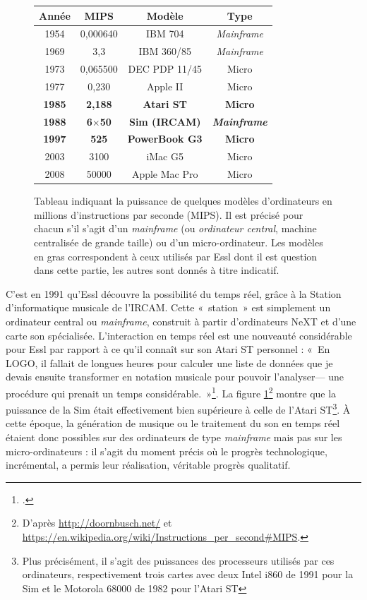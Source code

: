 \documentclass[a4paper,12pt]{article}
\newcommand{\guill}[1]{«~#1~»}
\begin{document}
\begin{figure}[h!]
\begin{center}
\begin{tabular}{|c|c|c|c|}
\hline
\textbf{Année} & \textbf{MIPS} & \textbf{Modèle} & \textbf{Type} \\
\hline
1954 & 0,000640 & IBM 704 & \emph{Mainframe} \\
\hline
1969 & 3,3 & IBM 360/85 & \emph{Mainframe} \\
\hline
1973 & 0,065500 & DEC PDP 11/45 & Micro \\
\hline
1977 & 0,230 & Apple II & Micro \\
\hline
\textbf{1985} & \textbf{2,188} & \textbf{Atari ST} & \textbf{Micro} \\
\hline
\textbf{1988} & \textbf{6$\times$50} & \textbf{Sim (IRCAM)} & \textbf{\emph{Mainframe}} \\
\hline
\textbf{1997} & \textbf{525} & \textbf{PowerBook G3} & \textbf{Micro} \\
\hline
2003 & 3100 & iMac G5 & Micro \\
\hline
2008 & 50000 & Apple Mac Pro & Micro \\
\hline
\end{tabular}
\label{tableaumips}
\caption{\footnotesize Tableau indiquant la puissance de quelques modèles d'ordinateurs en millions d'instructions par seconde (MIPS). Il est précisé pour chacun s'il s'agit d'un \emph{mainframe} (ou \emph{ordinateur central}, machine centralisée de grande taille) ou d'un micro-ordinateur. Les modèles en gras correspondent à ceux utilisés par Essl dont il est question dans cette partie, les autres sont donnés à titre indicatif.}
\end{center}
\end{figure}

C'est en 1991 qu'Essl découvre la possibilité du temps réel, grâce à la Station d'informatique musicale de l'IRCAM. Cette \guill{station} est simplement un ordinateur central ou \emph{mainframe}, construit à partir d'ordinateurs NeXT et d'une carte son spécialisée. L'interaction en temps réel est une nouveauté considérable pour Essl par rapport à ce qu'il connaît sur son Atari ST personnel : \guill{En LOGO, il fallait de longues heures pour calculer une liste de données que je devais ensuite transformer en notation musicale pour pouvoir l'analyser--- une procédure qui prenait un temps considérable.}\footnote{\cite{essl2010rtc}.}. La figure \ref{tableaumips}\footnote{D'après \href{http://doornbusch.net/}{http://doornbusch.net/} et  \href{https://en.wikipedia.org/wiki/Instruœctions\_per\_second\#MIPS}{https://en.wikipedia.org/wiki/Instructions\_per\_second\#MIPS}.} montre que la puissance de la Sim était effectivement bien supérieure à celle de l'Atari ST\footnote{Plus précisément, il s'agit des puissances des processeurs utilisés par ces ordinateurs, respectivement trois cartes avec deux Intel i860 de 1991 pour la Sim et le Motorola 68000 de 1982 pour l'Atari ST}. À cette époque, la génération de musique ou le traitement du son en temps réel étaient donc possibles sur des ordinateurs de type \emph{mainframe} mais pas sur les micro-ordinateurs : il s'agit du moment précis où le progrès technologique, incrémental, a permis leur réalisation, véritable progrès qualitatif.
\end{document}
